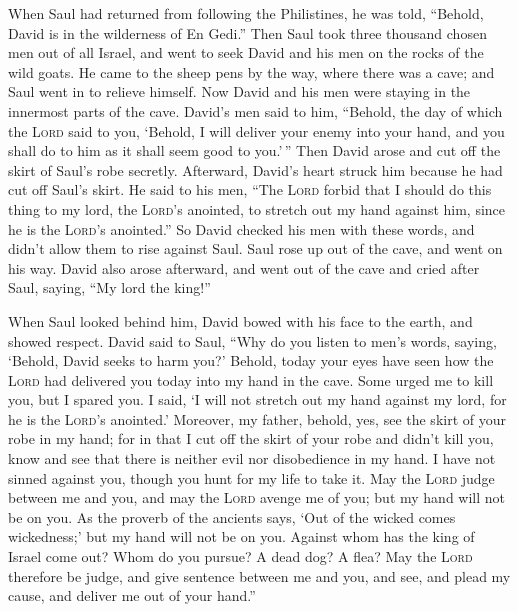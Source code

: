  When Saul had returned from following the Philistines, he
was told, ``Behold, David is in the wilderness of En Gedi.''
 Then Saul took three thousand chosen men out of all
Israel, and went to seek David and his men on the rocks of the wild
goats.  He came to the sheep pens by the way, where there
was a cave; and Saul went in to relieve himself. Now David and his men
were staying in the innermost parts of the cave.  David's
men said to him, ``Behold, the day of which the \textsc{Lord} said to
you, `Behold, I will deliver your enemy into your hand, and you shall do
to him as it shall seem good to you.'\,'' Then David arose and cut off
the skirt of Saul's robe secretly.  Afterward, David's
heart struck him because he had cut off Saul's skirt.  He
said to his men, ``The \textsc{Lord} forbid that I should do this thing
to my lord, the \textsc{Lord}'s anointed, to stretch out my hand against
him, since he is the \textsc{Lord}'s anointed.''  So David
checked his men with these words, and didn't allow them to rise against
Saul. Saul rose up out of the cave, and went on his way. 
David also arose afterward, and went out of the cave and cried after
Saul, saying, ``My lord the king!''

When Saul looked behind him, David bowed with his face to the earth, and
showed respect.  David said to Saul, ``Why do you listen
to men's words, saying, `Behold, David seeks to harm you?'
 Behold, today your eyes have seen how the \textsc{Lord}
had delivered you today into my hand in the cave. Some urged me to kill
you, but I spared you. I said, `I will not stretch out my hand against
my lord, for he is the \textsc{Lord}'s anointed.' 
Moreover, my father, behold, yes, see the skirt of your robe in my hand;
for in that I cut off the skirt of your robe and didn't kill you, know
and see that there is neither evil nor disobedience in my hand. I have
not sinned against you, though you hunt for my life to take it.
 May the \textsc{Lord} judge between me and you, and may
the \textsc{Lord} avenge me of you; but my hand will not be on you.
 As the proverb of the ancients says, `Out of the wicked
comes wickedness;' but my hand will not be on you. 
Against whom has the king of Israel come out? Whom do you pursue? A dead
dog? A flea?  May the \textsc{Lord} therefore be judge,
and give sentence between me and you, and see, and plead my cause, and
deliver me out of your hand.''


